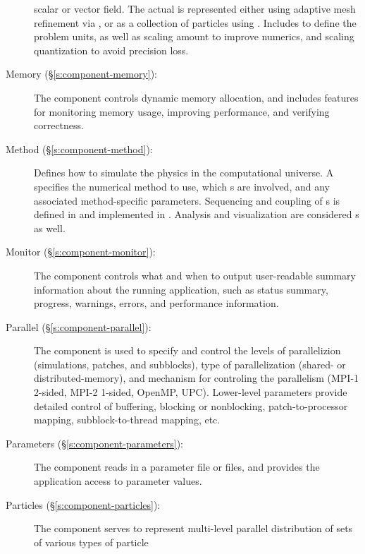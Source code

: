 \begin{description}
        scalar or vector field.  The actual  is
        represented either using adaptive mesh refinement via
        , or as a collection of particles using
        .  Includes  to define the problem
        units, as well as scaling amount to improve numerics, and
        scaling quantization to avoid precision loss.
%
 \item [\todo Memory (\S\ref{s:component-memory}): ]
%
        The  component controls dynamic memory
        allocation, and includes features for monitoring memory usage,
        improving performance, and verifying correctness.
%
 \item [\todo Method (\S\ref{s:component-method}): ]
%
        Defines how to simulate the physics in the computational
        universe.  A  specifies the numerical method to
        use, which s are involved, and any associated
        method-specific parameters.  Sequencing and coupling of
        s is defined in  and implemented in
        .  Analysis and visualization are considered
        s as well.
%
 \item [\todo Monitor (\S\ref{s:component-monitor}): ]
%
        The  component controls what and when to output
        user-readable summary information about the running
        application, such as status summary, progress, warnings,
        errors, and performance information.
%
 \item [\todo Parallel (\S\ref{s:component-parallel}): ]
%
        The  component is used to specify and control
        the levels of parallelizion (simulations, patches, and
        subblocks), type of parallelization (shared- or
        distributed-memory), and mechanism for controling the
        parallelism (MPI-1 2-sided, MPI-2 1-sided, OpenMP, UPC).
        Lower-level parameters provide detailed control of buffering,
        blocking or nonblocking, patch-to-processor mapping,
        subblock-to-thread mapping, etc.
%
 \item [\todo Parameters (\S\ref{s:component-parameters}): ]
%
        The  component
        reads in a parameter file or files, and provides the
        application access to parameter values.
%
 \item [\todo Particles (\S\ref{s:component-particles}): ]
%
        The  component serves to represent multi-level
        parallel distribution of sets of various types of particle

\end{description}
